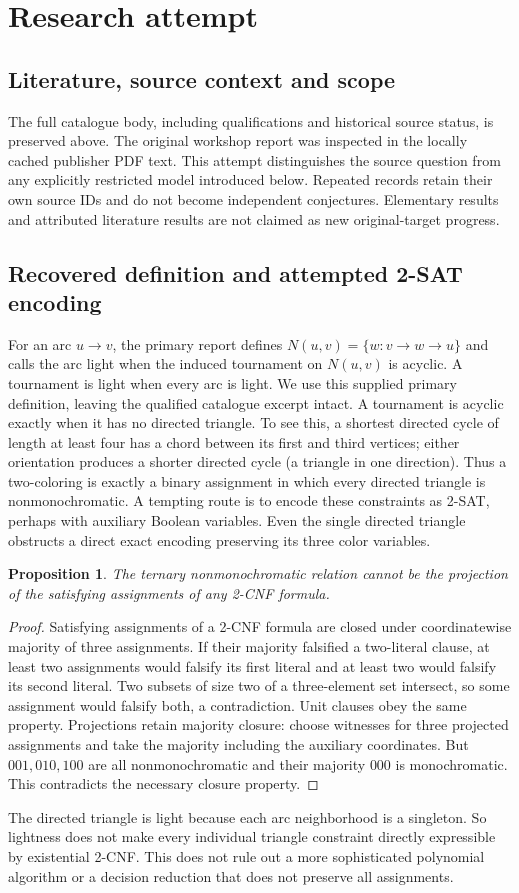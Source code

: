 \documentclass[11pt]{article}
\newtheorem{proposition}{Proposition}
\begin{document}
\section{Research attempt}
\subsection{Literature, source context and scope}
The full catalogue body, including qualifications and historical source status, is preserved above. The original workshop report was inspected in the locally cached publisher PDF text. This attempt distinguishes the source question from any explicitly restricted model introduced below. Repeated records retain their own source IDs and do not become independent conjectures. Elementary results and attributed literature results are not claimed as new original-target progress.

\subsection{Recovered definition and attempted 2-SAT encoding}
For an arc $u\to v$, the primary report defines $N(u,v)=\{w:v\to w\to u\}$ and calls the arc light when the induced tournament on $N(u,v)$ is acyclic. A tournament is light when every arc is light. We use this supplied primary definition, leaving the qualified catalogue excerpt intact.
A tournament is acyclic exactly when it has no directed triangle. To see this, a shortest directed cycle of length at least four has a chord between its first and third vertices; either orientation produces a shorter directed cycle (a triangle in one direction). Thus a two-coloring is exactly a binary assignment in which every directed triangle is nonmonochromatic.
A tempting route is to encode these constraints as 2-SAT, perhaps with auxiliary Boolean variables. Even the single directed triangle obstructs a direct exact encoding preserving its three color variables.
\begin{proposition}
The ternary nonmonochromatic relation cannot be the projection of the satisfying assignments of any 2-CNF formula.
\end{proposition}
\begin{proof}
Satisfying assignments of a 2-CNF formula are closed under coordinatewise majority of three assignments. If their majority falsified a two-literal clause, at least two assignments would falsify its first literal and at least two would falsify its second literal. Two subsets of size two of a three-element set intersect, so some assignment would falsify both, a contradiction. Unit clauses obey the same property. Projections retain majority closure: choose witnesses for three projected assignments and take the majority including the auxiliary coordinates.
But $001,010,100$ are all nonmonochromatic and their majority $000$ is monochromatic. This contradicts the necessary closure property.
\end{proof}
The directed triangle is light because each arc neighborhood is a singleton. So lightness does not make every individual triangle constraint directly expressible by existential 2-CNF. This does not rule out a more sophisticated polynomial algorithm or a decision reduction that does not preserve all assignments.
\end{document}
